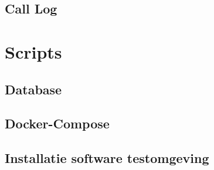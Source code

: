 \section{Call Log}\label{bij_model_calllog}


\chapter{Scripts}\label{bijlage_scripts}
\section{Database}\label{bij_database}


\section{Docker-Compose}\label{bij_docker}


\section{Installatie software testomgeving}\label{bij_installatie_software}
